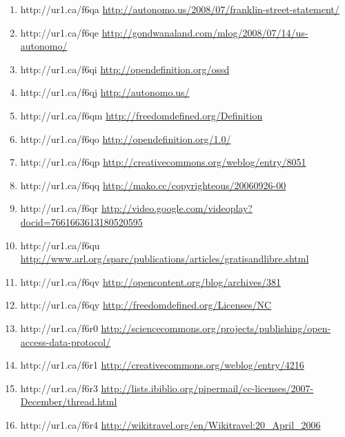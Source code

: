 \begin{enumerate}
    \item{http://ur1.ca/f6qa}
        \url{http://autonomo.us/2008/07/franklin-street-statement/}

    \item{http://ur1.ca/f6qe}
        \url{http://gondwanaland.com/mlog/2008/07/14/us-autonomo/}

    \item{http://ur1.ca/f6qi}
        \url{http://opendefinition.org/ossd}

    \item{http://ur1.ca/f6qj}
        \url{http://autonomo.us/}

    \item{http://ur1.ca/f6qm}
        \url{http://freedomdefined.org/Definition}

    \item{http://ur1.ca/f6qo}
        \url{http://opendefinition.org/1.0/}

    \item{http://ur1.ca/f6qp}
        \url{http://creativecommons.org/weblog/entry/8051}

    \item{http://ur1.ca/f6qq}
        \url{http://mako.cc/copyrighteous/20060926-00}

    \item{http://ur1.ca/f6qr}
        \url{http://video.google.com/videoplay?docid=7661663613180520595}

    \item{http://ur1.ca/f6qu}
        \url{http://www.arl.org/sparc/publications/articles/gratisandlibre.shtml}

    \item{http://ur1.ca/f6qv}
        \url{http://opencontent.org/blog/archives/381}

    \item{http://ur1.ca/f6qy}
        \url{http://freedomdefined.org/Licenses/NC}

    \item{http://ur1.ca/f6r0}
        \url{http://sciencecommons.org/projects/publishing/open-access-data-protocol/}

    \item{http://ur1.ca/f6r1}
        \url{http://creativecommons.org/weblog/entry/4216}

    \item{http://ur1.ca/f6r3}
        \url{http://lists.ibiblio.org/pipermail/cc-licenses/2007-December/thread.html}

    \item{http://ur1.ca/f6r4}
        \url{http://wikitravel.org/en/Wikitravel:20\_April\_2006}


\end{enumerate}
